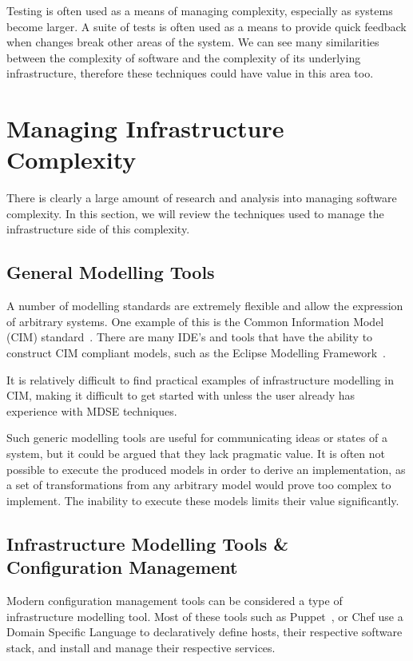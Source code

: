 \documentclass{cshonours}
\begin{document}
Testing is often used as a means of managing complexity, especially as systems become larger. A suite of tests is often used as a means to provide quick feedback when changes break other areas of the system. We can see many similarities between the complexity of software and the complexity of its underlying infrastructure, therefore these techniques could have value in this area too.

\pagebreak
\section{Managing Infrastructure Complexity}

There is clearly a large amount of research and analysis into managing software complexity. In this section, we will review the techniques used to manage the infrastructure side of this complexity.

\subsection{General Modelling Tools}

A number of modelling standards are extremely flexible and allow the expression of arbitrary systems. One example of this is the Common Information Model (CIM) standard~\cite{CIM}. There are many IDE’s and tools that have the ability to construct CIM compliant models, such as the Eclipse Modelling Framework~\cite{EMF}.

It is relatively difficult to find practical examples of infrastructure modelling in CIM, making it difficult to get started with unless the user already has experience with MDSE techniques.

Such generic modelling tools are useful for communicating ideas or states of a system, but it could be argued that they lack pragmatic value. It is often not possible to execute the produced models in order to derive an implementation, as a set of transformations from any arbitrary model would prove too complex to implement. The inability to execute these models limits their value significantly.

\subsection{Infrastructure Modelling Tools \& Configuration Management}

Modern configuration management tools can be considered a type of infrastructure modelling tool. Most of these tools such as Puppet~\cite{Puppet}, or Chef\cite{Chef} use a Domain Specific Language to declaratively define hosts, their respective software stack, and install and manage their respective services.
\end{document}
